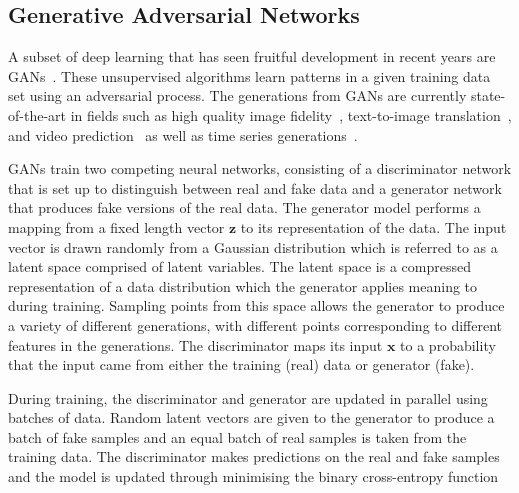 \documentclass[12pt]{iopart}
\begin{document}
\subsection{Generative Adversarial Networks}
%
%
A subset of deep learning that has seen fruitful development in recent years
are \acp{GAN}~\cite{Goodfellow2014}. These unsupervised algorithms learn patterns in a
given training data set using an adversarial process. The generations from
\acp{GAN} are currently state-of-the-art in fields such as high quality image
fidelity~\cite{brock2018large,karras2019analyzing}, text-to-image
translation~\cite{reed2016generative}, and video
prediction~\cite{liang2017dual} as well as time series
generations~\cite{esteban2017realvalued}.

%
\acp{GAN} train two competing neural networks, consisting of a discriminator
network that is set up to distinguish between real and fake data and a
generator network that produces fake versions of the real data. The generator model performs a mapping from a fixed length vector $\mathbf{z}$ to its
representation of the data. The input vector is drawn randomly from a Gaussian distribution which is referred to as a latent space comprised of latent variables. The latent space is a compressed representation of a data distribution which the generator applies meaning to during training. Sampling points from this space allows the generator to produce a variety of different generations, with different points corresponding to different features in the generations. The discriminator maps its input $\mathbf{x}$ to a probability that the input came from either the training (real) data or
generator (fake).

%
During training, the discriminator and generator are updated in parallel using batches of data. Random latent vectors are given to the generator to produce a batch of fake samples and an equal batch of real samples is taken from the training data. The discriminator makes predictions on the real and fake samples and the model is updated through minimising the binary cross-entropy function \cite{Goodfellow-et-al-2016}
\end{document}
